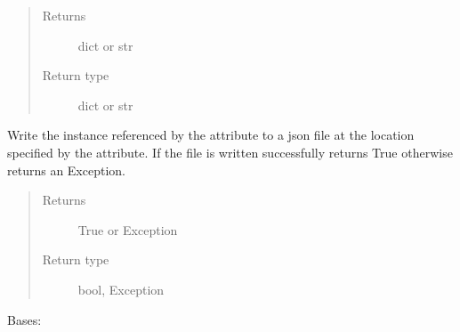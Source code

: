 \documentclass[letterpaper,10pt,english]{sphinxmanual}
\begin{document}
\begin{fulllineitems}
\begin{fulllineitems}
\begin{quote}
\begin{description}
\item[{Returns}] \leavevmode
dict or str

\item[{Return type}] \leavevmode
dict or str

\end{description}\end{quote}

\end{fulllineitems}


\begin{fulllineitems}
\label{\detokenize{polo.utils:polo.utils.io_utils.JsonWriter.write_json}}
Write the  instance referenced by the 
attribute to a json file at
the location specified by the
 attribute.
If the file is written successfully returns True
otherwise returns an Exception.
\begin{quote}\begin{description}
\item[{Returns}] \leavevmode
True or Exception

\item[{Return type}] \leavevmode
bool, Exception

\end{description}\end{quote}

\end{fulllineitems}


\end{fulllineitems}


\begin{fulllineitems}
\label{\detokenize{polo.utils:polo.utils.io_utils.Menu}}
Bases: 

\begin{fulllineitems}
\label{\detokenize{polo.utils:polo.utils.io_utils.Menu.cocktails}}
\end{fulllineitems}


\end{fulllineitems}
\end{document}
